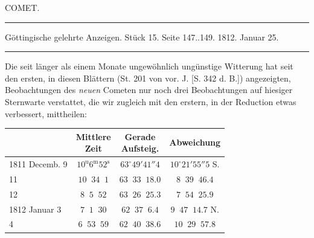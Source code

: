 \par\bigskip{}
\hypertarget{native-350-lower}{}\label{native-350-lower}
\begin{center}\large COMET.\end{center}
\begin{center}\parbox{.90\linewidth}{\centering\small\frenchspacing
\hrule height .3pt\relax\vspace{2.5pt}
Göttingische gelehrte Anzeigen. Stück 15. Seite 147..149. 1812. Januar 25.\par
\vspace{2.5pt}\hrule height .3pt\relax
}\end{center}

\par\indent Die seit länger als einem Monate ungewöhnlich ungünstige Witterung hat seit den ersten, in diesen Blättern (St. 201 von vor. J. [S. 342 d. B.]) angezeigten, Beobachtungen des \emph{neuen} Cometen nur noch drei Beobachtungen auf hiesiger Sternwarte verstattet, die wir zugleich mit den erstern, in der Reduction etwas verbessert, mittheilen:

\begin{center}
\fontsize{10}{12}\selectfont\setlength{\tabcolsep}{3pt}\renewcommand{\arraystretch}{1.15}\begin{tabular}{l|c|c|c}
 & \shortstack{Mittlere\\Zeit} & \shortstack{Gerade\\Aufsteig.} & Abweichung \\
\hline
1811 Decemb. 9 & $10^{\text{u}}6^{\text{m}}52^{\text{s}}$ & $63^\circ49'41''4$ & $10^\circ21'55''5$ S. \\
11 & $10\;\;34\;\;1$ & $63\;\;33\;\;18.0$ & $8\;\;39\;\;46.4$ \\
12 & $8\;\;5\;\;52$ & $63\;\;26\;\;25.3$ & $7\;\;54\;\;25.9$ \\
1812 Januar 3 & $7\;\;1\;\;30$ & $62\;\;37\;\;6.4$ & $9\;\;47\;\;14.7$ N. \\
4 & $6\;\;53\;\;59$ & $62\;\;40\;\;38.6$ & $10\;\;29\;\;57.8$ \\
\end{tabular}
\end{center}

